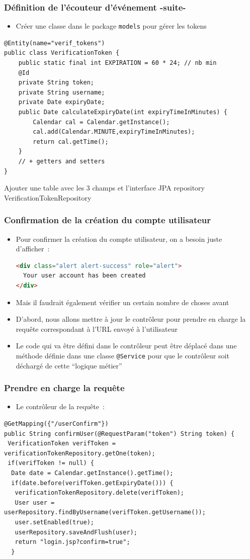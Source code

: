 \documentclass{beamer}
\begin{document}
\begin{frame}[fragile]
	\frametitle{Définition de l'écouteur d'événement -suite-}
	\begin{itemize}
		\item Créer une classe dans le package \texttt{models} pour gérer les tokens
	\end{itemize}
\begin{lstlisting}
@Entity(name="verif_tokens")
public class VerificationToken {
	public static final int EXPIRATION = 60 * 24; // nb min
	@Id
	private String token;
	private String username;
	private Date expiryDate;
	public Date calculateExpiryDate(int expiryTimeInMinutes) {
		Calendar cal = Calendar.getInstance();
		cal.add(Calendar.MINUTE,expiryTimeInMinutes);
		return cal.getTime();
	}
	// + getters and setters
}
\end{lstlisting}
Ajouter une table avec les 3 champs et l'interface JPA repository VerificationTokenRepository
\end{frame}

\begin{frame}[fragile]
	\frametitle{Confirmation de la création du compte utilisateur}
	\begin{itemize}
		\item Pour confirmer la création du compte utilisateur, on a besoin juste d'afficher~:
\begin{lstlisting}[language=Html]
<div class="alert alert-success" role="alert">
  Your user account has been created
</div>
\end{lstlisting} 
\item Mais il faudrait également vérifier un certain nombre de choses avant
\item D'abord, nous allons mettre à jour le contrôleur pour prendre en charge la requête correspondant à l'URL envoyé à l'utilisateur
\item Le code qui va être défini dans le contrôleur peut être déplacé dans une méthode définie dans une classe \texttt{@Service} pour que le contrôleur soit déchargé de cette ``logique métier''
	\end{itemize}
\end{frame}

\begin{frame}[fragile]
	\frametitle{Prendre en charge la requête}
	\begin{itemize}
		\item Le contrôleur de la requête~:
	\end{itemize}
\begin{lstlisting}
@GetMapping({"/userConfirm"})
public String confirmUser(@RequestParam("token") String token) {
 VerificationToken verifToken = verificationTokenRepository.getOne(token);
 if(verifToken != null) {
  Date date = Calendar.getInstance().getTime();
  if(date.before(verifToken.getExpiryDate())) {
   verificationTokenRepository.delete(verifToken);
   User user = userRepository.findByUsername(verifToken.getUsername());
   user.setEnabled(true);
   userRepository.saveAndFlush(user);
   return "login.jsp?confirm=true";
  }
\end{lstlisting}
\end{frame}
\end{document}
